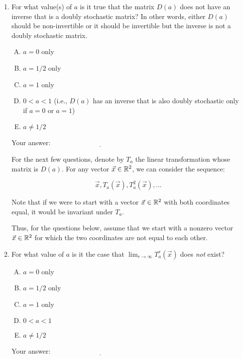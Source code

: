 \documentclass[10pt]{amsart}
\begin{document}
\begin{enumerate}
\item For what value(s) of $a$ is it true that the matrix $D(a)$ does
  not have an inverse that is a doubly stochastic matrix? In other
  words, either $D(a)$ should be non-invertible or it should be
  invertible but the inverse is not a doubly stochastic matrix.

  \begin{enumerate}[(A)]
  \item $a = 0$ only
  \item $a = 1/2$ only
  \item $a = 1$ only
  \item $0 < a < 1$ (i.e., $D(a)$ has an inverse that is also doubly
    stochastic only if $a = 0$ or $a = 1$)
  \item $a \ne 1/2$
  \end{enumerate}

  \vspace{0.1in}
  Your answer: $\underline{\qquad\qquad\qquad\qquad\qquad\qquad\qquad}$
  \vspace{0.1in}

  For the next few questions, denote by $T_a$ the linear
  transformation whose matrix is $D(a)$. For any vector $\vec{x} \in
  \mathbb{R}^2$, we can consider the sequence:

  $$\vec{x}, T_a(\vec{x}), T_a^2(\vec{x}), \dots$$

  Note that if we were to start with a vector $\vec{x} \in \mathbb{R}^2$ with
  both coordinates equal, it would be invariant under $T_a$.

  Thus, for the questions below, assume that we start with a nonzero
  vector $\vec{x} \in \mathbb{R}^2$ for which the two coordinates are not
  equal to each other.

\item For what value of $a$ is it the case that $\lim_{r \to \infty}
  T_a^r(\vec{x})$ does {\em not} exist?

  \begin{enumerate}[(A)]
  \item $a = 0$ only
  \item $a = 1/2$ only
  \item $a = 1$ only
  \item $0 < a < 1$
  \item $a \ne 1/2$
  \end{enumerate}

  \vspace{0.1in}
  Your answer: $\underline{\qquad\qquad\qquad\qquad\qquad\qquad\qquad}$
  \vspace{0.1in}


\end{enumerate}
\end{document}
